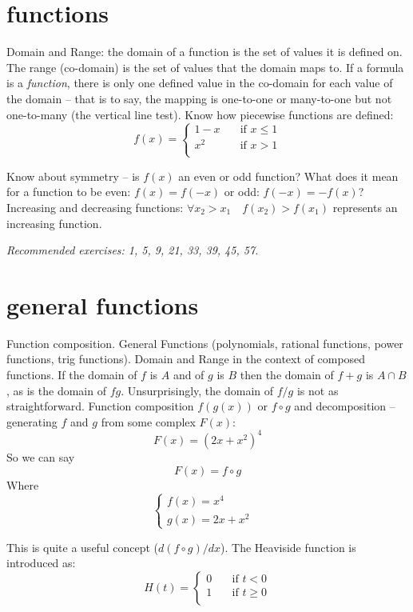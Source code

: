 \documentclass[10pt,a4paper]{report}
\begin{document}
\section{functions}
Domain and Range: the domain of a function is the set of values it is defined on. The range (co-domain) is the set of values that the domain maps to.
If a formula is a \emph{function}, there is only one defined value in the co-domain for each value of the domain -- that is to say, the mapping is one-to-one or many-to-one but not one-to-many (the vertical line test).
Know how piecewise functions are defined:
$$ f(x) =
	\begin{cases}
		1 - x 	& \quad \text{if } x \leq 1 \\
		x^2		& \quad \text{if } x > 1 \\
	\end{cases}
$$

Know about symmetry -- is $f(x)$ an even or odd function?
What does it mean for a function to be even: $f(x) = f(-x)$ or odd: $f(-x) = -f(x)$?
Increasing and decreasing functions: $\forall x_2 > x_1 \quad f(x_2) > f(x_1)$ represents an increasing function.

\emph{Recommended exercises: 1, 5, 9, 21, 33, 39, 45, 57.}

\section{general functions}
Function composition.
General Functions (polynomials, rational functions, power functions, trig functions).
Domain and Range in the context of composed functions.
If the domain of $f$ is $A$ and of $g$ is $B$ then the domain of $f + g$ is $A \cap B$, as is the domain of $fg$. Unsurprisingly, the domain of $f/g$ is not as straightforward.
Function composition $f(g(x))$ or $f \circ g$ and decomposition -- generating $f$ and $g$ from some complex $F(x)$:
$$
F(x) = (2x + x^2)^4 
$$
So we can say
$$
F(x) = f \circ g 
$$
Where
$$
	\begin{cases}
		f(x) = x^4 & \\
		g(x) = 2x + x^2 & 
	\end{cases}
$$

This is quite a useful concept ($d(f \circ g)/dx$).
The Heaviside function is introduced as:
$$
H(t) = 
	\begin{cases}
		0 	& \quad \text{if } t < 0 \\
		1 	& \quad \text{if } t \geq 0 \\
	\end{cases}
$$
\end{document}
